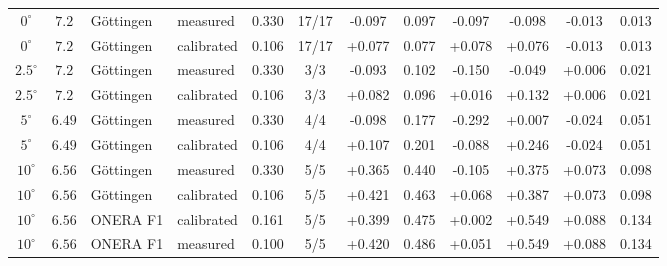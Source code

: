 \begin{table}[tp]
\begin{tabular}{cc l l c c cccc cc}
    \midrule
    $0^\circ$ & $7.2$ & G\"ottingen & measured & 0.330 & 17/17 & -0.097 & 0.097 & -0.097 & -0.098 & -0.013 & 0.013 \\
    $0^\circ$ & $7.2$ & G\"ottingen & calibrated & 0.106 & 17/17 & +0.077 & 0.077 & +0.078 & +0.076 & -0.013 & 0.013 \\
    $2.5^\circ$ & $7.2$ & G\"ottingen & measured & 0.330 & 3/3 & -0.093 & 0.102 & -0.150 & -0.049 & +0.006 & 0.021 \\
    $2.5^\circ$ & $7.2$ & G\"ottingen & calibrated & 0.106 & 3/3 & +0.082 & 0.096 & +0.016 & +0.132 & +0.006 & 0.021 \\
    $5^\circ$ & $6.49$ & G\"ottingen & measured & 0.330 & 4/4 & -0.098 & 0.177 & -0.292 & +0.007 & -0.024 & 0.051 \\
    $5^\circ$ & $6.49$ & G\"ottingen & calibrated & 0.106 & 4/4 & +0.107 & 0.201 & -0.088 & +0.246 & -0.024 & 0.051 \\
    $10^\circ$ & $6.56$ & G\"ottingen & measured & 0.330 & 5/5 & +0.365 & 0.440 & -0.105 & +0.375 & +0.073 & 0.098 \\
    $10^\circ$ & $6.56$ & G\"ottingen & calibrated & 0.106 & 5/5 & +0.421 & 0.463 & +0.068 & +0.387 & +0.073 & 0.098 \\
    $10^\circ$ & $6.56$ & ONERA F1 & calibrated & 0.161 & 5/5 & +0.399 & 0.475 & +0.002 & +0.549 & +0.088 & 0.134 \\
    $10^\circ$ & $6.56$ & ONERA F1 & measured & 0.100 & 5/5 & +0.420 & 0.486 & +0.051 & +0.549 & +0.088 & 0.134 \\
    \bottomrule
  \end{tabular}
\end{table}
